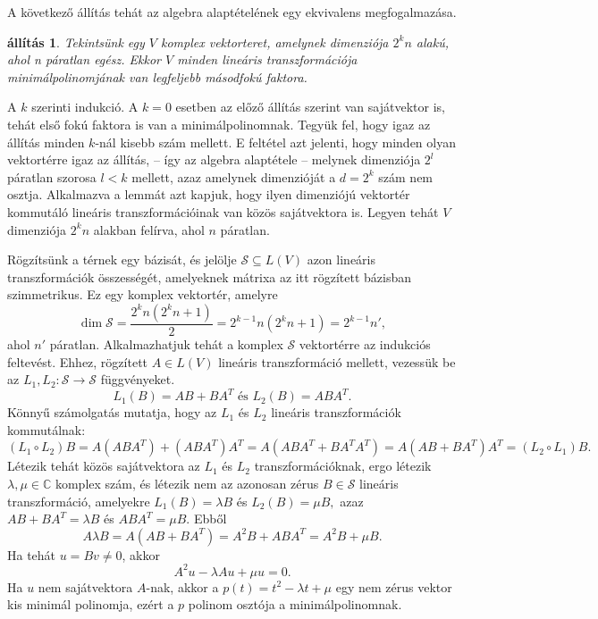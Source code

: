 \documentclass[9pt, showtrims]{memoir}
\makeatletter
\renewenvironment{proof}[1][\proofname]
    {\par\pushQED{\qed}%
    \normalfont \topsep6\p@\@plus6\p@\relax
    \trivlist
    \item[\hskip\labelsep
        \itshape
    #1\@addpunct{:}]\ignorespaces}
    {\popQED\endtrivlist\@endpefalse}
\theoremstyle{plain}
\newtheorem{proposition}{állítás}[section]
\theoremstyle{remark}
\theoremstyle{definition}
\makeatother
\begin{document}
A következő állítás tehát az algebra alaptételének egy ekvivalens megfogalmazása.
\begin{proposition}
    Tekintsünk egy $V$ komplex vektorteret, amelynek dimenziója $2^kn$ alakú,
    ahol n páratlan egész.
    Ekkor $V$ minden lineáris transzformációja minimálpolinomjának 
    van legfeljebb másodfokú faktora.
\end{proposition}
\begin{proof}
    A $k$ szerinti indukció.
    A $k=0$ esetben az előző állítás szerint van sajátvektor is, 
    tehát első fokú faktora is van a minimálpolinomnak.
    Tegyük fel, hogy igaz az állítás minden $k$-nál kisebb szám mellett.
    E feltétel azt jelenti, hogy minden olyan vektortérre igaz az állítás,
    -- így az algebra alaptétele --
    melynek dimenziója $2^l$ páratlan szorosa $l<k$ mellett, 
    azaz amelynek dimenzióját a $d=2^k$ szám nem osztja.
    Alkalmazva a lemmát azt kapjuk, hogy ilyen dimenziójú vektortér kommutáló
    lineáris transzformációinak van közös sajátvektora is.
    Legyen tehát $V$ dimenziója $2^kn$ alakban felírva, ahol $n$ páratlan.

    Rögzítsünk a térnek egy bázisát, és jelölje
    \(
        \mathcal{S}\subseteq L(V)
    \)
    azon lineáris transzformációk összességét, 
    amelyeknek mátrixa az itt rögzített bázisban szimmetrikus.
    Ez egy komplex vektortér,
    amelyre
    \[
        \operatorname{dim}\mathcal{S}=
        \frac{2^kn\left( 2^kn+1 \right)}{2}=
        2^{k-1}n\left(2^kn+1  \right)=
        2^{k-1}n',
    \]
    ahol $n'$ páratlan.
    Alkalmazhatjuk tehát a komplex $\mathcal{S}$ vektortérre az indukciós feltevést.
    Ehhez, rögzített $A\in L\left( V \right)$ lineáris transzformáció mellett, 
    vezessük be az $L_1,L_2:\mathcal{S}\to\mathcal{S}$ függvényeket.
    \[
        L_1\left( B \right)=AB+BA^T \text{ és }
        L_2\left( B \right)=ABA^T.
    \]
    Könnyű számolgatás mutatja, hogy az $L_1$ és $L_2$ lineáris transzformációk kommutálnak:
    \[
        \left( L_1\circ L_2\right)B=
        A\left( ABA^T \right)+\left( ABA^T \right)A^T=
        A\left( ABA^T+BA^TA^T \right)=
        A\left( AB+BA^T \right)A^T =
        \left( L_2\circ L_1 \right)B.
    \]
    Létezik tehát közös sajátvektora az $L_1$ és $L_2$ transzformációknak, ergo
    létezik $\lambda,\mu\in\mathbb{C}$ komplex szám, 
    és létezik nem az azonosan zérus $B\in\mathcal{S}$ lineáris transzformáció,
    amelyekre 
    $
    L_1\left( B \right)=\lambda B
    $
    és
    $
    L_2\left( B \right)=\mu B,
    $
    azaz
    $
    AB+BA^T=\lambda B
    $
    és
    $
    ABA^T=\mu B.
    $
    Ebből
    \[
        A\lambda B=
        A\left( AB+BA^T \right)=
        A^2B + ABA^T=
        A^2B + \mu B.
    \]
    Ha tehát $u=Bv\neq 0$, akkor
    \[
        A^2u-\lambda Au+\mu u=0.
    \]
    Ha $u$ nem sajátvektora $A$-nak, akkor a 
    $p\left( t \right)=t^2-\lambda t+\mu$
    egy nem zérus vektor kis minimál polinomja, 
    ezért a $p$ polinom osztója a minimálpolinomnak.
\end{proof}
\end{document}
